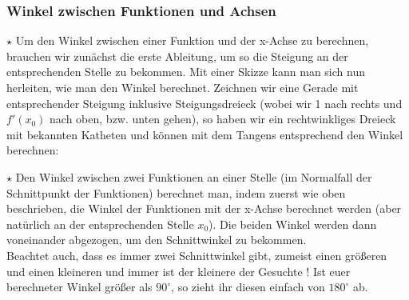 	\subsubsection{Winkel zwischen Funktionen und Achsen}
		\(\star\) Um den Winkel zwischen einer Funktion und der x-Achse zu berechnen,
		brauchen wir zunächst die erste Ableitung, um so die Steigung an der
		entsprechenden Stelle zu bekommen. Mit einer Skizze kann man sich nun
		herleiten, wie man den Winkel berechnet. Zeichnen wir eine Gerade mit
		entsprechender Steigung inklusive Steigungsdreieck (wobei wir 1 nach rechts
		und \(f'(x_0)\) nach oben, bzw. unten gehen), so haben wir ein rechtwinkliges
		Dreieck mit bekannten Katheten und können mit dem Tangens entsprechend den
		Winkel berechnen:
		\formel{\[\alpha = tan^{-1}(f'(x_0))\]}

		\(\star\) Den Winkel zwischen zwei Funktionen an einer Stelle (im Normalfall
		der Schnittpunkt der Funktionen) berechnet man, indem zuerst wie oben
		beschrieben, die Winkel der Funktionen mit der x-Achse berechnet werden (aber
		natürlich an der entsprechenden Stelle \(x_0\)). Die beiden Winkel werden dann
		voneinander abgezogen, um den Schnittwinkel zu bekommen.\\
		Beachtet auch, dass es immer zwei Schnittwinkel gibt, zumeist einen größeren
		und einen kleineren und immer ist  der kleinere der Gesuchte ! Ist euer
		berechneter Winkel größer als \(90^\circ\), so zieht ihr diesen einfach von
		\(180^\circ\) ab.
